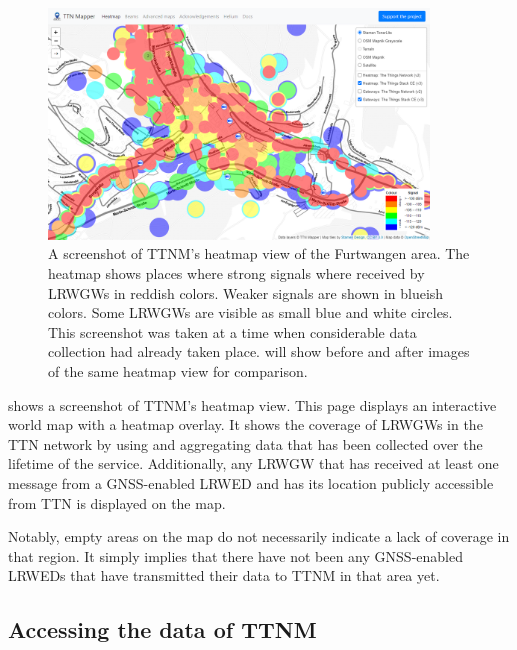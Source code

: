 \begin{figure}[htbp]
    \centering
    \includegraphics[width=0.9\textwidth]{pictures/ttn-mapper/heatmap_with_gateways.png}
    \caption[Screenshot of \acl{TTNM}'s heatmap view of the Furtwangen area.]{
        A screenshot of \ac{TTNM}'s heatmap view of the Furtwangen area.
        The heatmap shows places where strong signals where received by \aclp{LRWGW} in reddish colors.
        Weaker signals are shown in blueish colors.
        Some \aclp{LRWGW} are visible as small blue and white circles.
        This screenshot was taken at a time when considerable data collection had already taken place.
         will show before and after images of the same heatmap view for comparison.~\protect\cite{ttn_mapper_ttn_2023}
    }\label{pic:ttn-mapper-heatmap-with-gateways}
\end{figure}

 shows a screenshot of \acl{TTNM}'s heatmap view.
This page displays an interactive world map with a heatmap overlay.
It shows the coverage of \aclp{LRWGW} in the \ac{TTN} network by using and aggregating data that has been collected over the lifetime of the service.
Additionally, any \acl{LRWGW} that has received at least one message from a \ac{GNSS}-enabled \acl{LRWED} and has its location publicly accessible from \ac{TTN} is displayed on the map.

Notably, empty areas on the map do not necessarily indicate a lack of coverage in that region.
It simply implies that there have not been any \ac{GNSS}-enabled \aclp{LRWED} that have transmitted their data to \ac{TTNM} in that area yet.

\subsection{Accessing the data of \acl{TTNM}}

